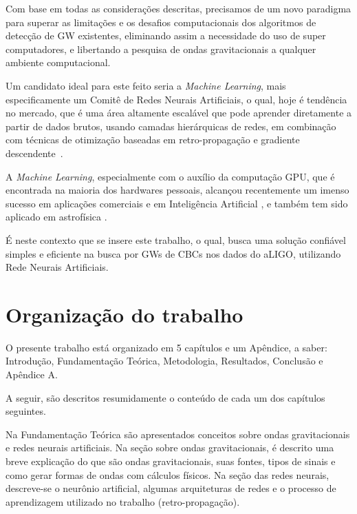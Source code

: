Com base em todas as considerações descritas, precisamos de um novo paradigma para superar as limitações e os desafios computacionais dos algoritmos de detecção de GW existentes, eliminando assim a necessidade do uso de super computadores, e libertando a pesquisa de ondas gravitacionais a qualquer ambiente computacional.

Um candidato ideal para este feito seria a \textit{Machine Learning}, mais especificamente um Comitê de Redes Neurais Artificiais, o qual, hoje é tendência no mercado, que é uma área  altamente escalável que pode aprender diretamente a partir de dados brutos, usando camadas hierárquicas de redes, em combinação com técnicas de otimização baseadas em retro-propagação e gradiente descendente~\cite{barca2005treinamento}. 

A \textit{Machine Learning}, especialmente com o auxílio da computação GPU, que é encontrada na maioria dos hardwares pessoais, alcançou recentemente um imenso sucesso em aplicações comerciais e em Inteligência Artificial \cite{esteva2017dermatologist, moravvcik2017deepstack, van2016wavenet, 10.1007/978-3-319-44188-7_16}, e também tem sido aplicado em astrofísica \cite{shen2017denoising,PhysRevLett.120.141103,krastev2019real,gebhard2019convolutional,mukund2017transient,kim2015application,george2018deep,george2017glitch, george2017deepA}.

É neste contexto que se insere este trabalho, o qual, busca uma solução confiável simples e eficiente na busca por GWs de CBCs nos dados do aLIGO, utilizando Rede Neurais Artificiais.

\section{Organização do trabalho}
\label{sec:organizacao-do-trabalho}

O presente trabalho está organizado em 5 capítulos e um Apêndice, a saber: Introdução, Fundamentação Teórica, Metodologia, Resultados, Conclusão e Apêndice A. 

A seguir, são descritos resumidamente o conteúdo de cada um dos capítulos seguintes.

Na Fundamentação Teórica são apresentados conceitos sobre ondas gravitacionais e redes neurais artificiais. Na seção sobre ondas gravitacionais, é descrito uma breve explicação do que são ondas gravitacionais, suas fontes, tipos de sinais e como gerar formas de ondas com cálculos físicos. Na seção das redes neurais, descreve-se o neurônio artificial, algumas arquiteturas de redes e o processo de aprendizagem utilizado no trabalho (retro-propagação). 

